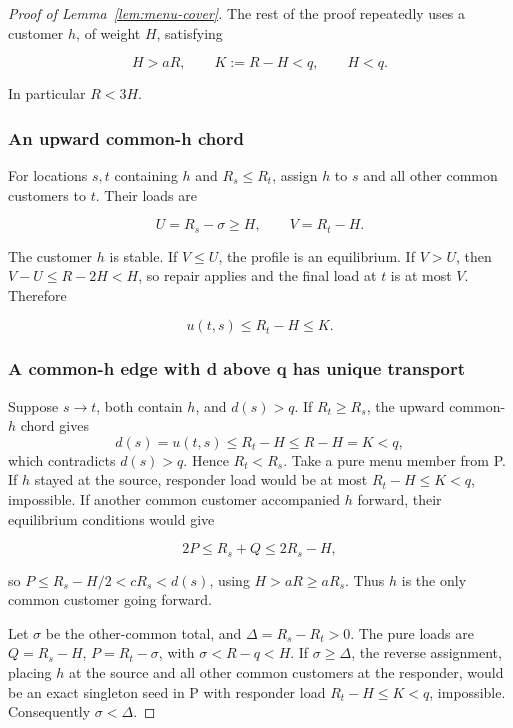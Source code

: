 \documentclass[11pt]{amsart}
\numberwithin{equation}{section}
\theoremstyle{definition}
\begin{document}
\begin{proof}[Proof of Lemma~\ref{lem:menu-cover}]
The rest of the proof repeatedly uses a customer \(h\), of weight \(H\), satisfying

\begin{equation}
H>aR,\qquad K:=R-H<q,\qquad H<q. \label{eq:old-9-1}
\end{equation}

In particular \(R<3H\).


\subsubsection{An upward common-h chord}\label{an-upward-common-h-chord}

For locations \(s,t\) containing \(h\) and \(R_s\le R_t\), assign \(h\) to \(s\) and all other common customers to \(t\). Their loads are

\[
U=R_s-\sigma\ge H,\qquad V=R_t-H.
\]

The customer \(h\) is stable. If \(V\le U\), the profile is an equilibrium. If \(V>U\), then \(V-U\le R-2H<H\), so repair applies and the final load at \(t\) is at most \(V\). Therefore

\begin{equation}
u(t,s)\le R_t-H\le K. \label{eq:old-9-2}
\end{equation}


\subsubsection{A common-h edge with d above q has unique transport}\label{a-common-h-edge-with-d-above-q-has-unique-transport}

Suppose \(s\to t\), both contain \(h\), and \(d(s)>q\). If \(R_t\ge R_s\), the upward common-\(h\) chord gives
\[
d(s)=u(t,s)\le R_t-H\le R-H=K<q,
\]
which contradicts \(d(s)>q\). Hence \(R_t<R_s\). Take a pure menu member from P. If \(h\) stayed at the source, responder load would be at most \(R_t-H\le K<q\), impossible. If another common customer accompanied \(h\) forward, their equilibrium conditions would give

\[
2P\le R_s+Q\le2R_s-H,
\]

so \(P\le R_s-H/2<cR_s<d(s)\), using \(H>aR\ge aR_s\). Thus \(h\) is the only common customer going forward.

Let \(\sigma\) be the other-common total, and \(\Delta=R_s-R_t>0\). The pure loads are \(Q=R_s-H\), \(P=R_t-\sigma\), with \(\sigma<R-q<H\). If \(\sigma\ge\Delta\), the reverse assignment, placing \(h\) at the source and all other common customers at the responder, would be an exact singleton seed in P with responder load \(R_t-H\le K<q\), impossible. Consequently \(\sigma<\Delta\).


\end{proof}
\end{document}
